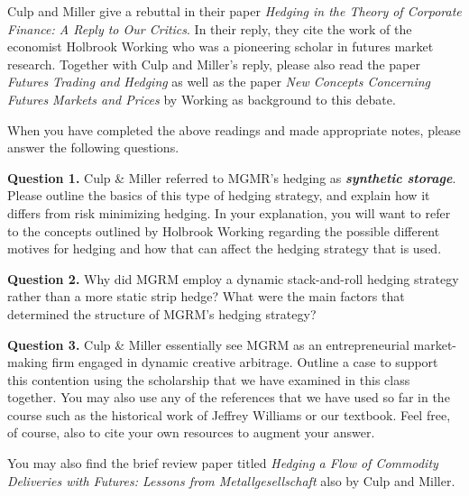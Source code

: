 \documentclass[12pt]{article}
\begin{document}
\vspace{10mm}

Culp and Miller give a rebuttal in their paper \textit{Hedging in the Theory of Corporate Finance: A Reply to Our Critics}. In their reply, they
cite the work of the economist Holbrook Working who was a pioneering scholar in futures market research. Together with Culp and Miller's reply, 
please also read the paper \textit{Futures Trading and Hedging} as well as the paper \textit{New Concepts Concerning Futures Markets and Prices}
by Working as background to this debate. 

\vspace{10mm}

When you have completed the above readings and made appropriate notes, please answer the following questions.

\vspace{10mm}

\textbf{Question 1.} Culp \& Miller referred to MGMR's hedging as \textbf{\textit{synthetic storage}}. Please outline the basics of this
		type of hedging strategy, and explain how it differs from risk minimizing hedging. In your explanation, you will want to refer to the concepts
		outlined by Holbrook Working regarding the possible different motives for hedging and how that can affect the hedging strategy that is used. 

\vspace{10mm}

\textbf{Question 2.} Why did MGRM employ a dynamic stack-and-roll hedging strategy rather than a more static strip hedge? What were the main factors
       that determined the structure of MGRM's hedging strategy? 

\vspace{10mm}

\textbf{Question 3.} Culp \& Miller essentially see MGRM as an entrepreneurial market-making firm engaged in dynamic creative arbitrage. Outline a case
       to support this contention using the scholarship that we have examined in this class together. You may also use any of
	   the references that we have used so far in the course such as the historical work of Jeffrey Williams or our textbook. Feel free, of course, also
	   to cite your own resources to augment your answer. 


\vspace{10mm}

You may also find the brief review paper titled \textit{Hedging a Flow of Commodity Deliveries with Futures: Lessons from Metallgesellschaft} also by
Culp and Miller.
\end{document}
